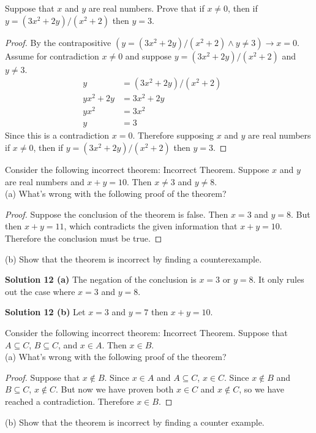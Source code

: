 \begin{tcolorbox}[title=Problem 11, breakable]
    Suppose that $x$ and $y$ are real numbers. Prove that
    if $x \not = 0$, then if $y = (3x^2 + 2y)/(x^2 + 2)$ then $y = 3$.
\end{tcolorbox}

\begin{proof}
    By the contrapositive $(y = (3x^2 + 2y)/(x^2 + 2) \wedge y \not = 3) \rightarrow x = 0$.
    Assume for contradiction $x \not = 0$ and suppose $y = (3x^2 + 2y)/(x^2 + 2)$ and $y \not = 3$.
    \begin{align*}
        y         & = (3x^2 + 2y)/(x^2 + 2) &  & \\
        yx^2 + 2y & = 3x^2 + 2y             &  & \\
        yx^2      & = 3x^2                  &  & \\
        y         & = 3
    \end{align*}
    Since this is a contradiction $x = 0$. Therefore supposing $x$ and $y$ are real numbers 
    if $x \not = 0$, then if $y = (3x^2 + 2y)/(x^2 + 2)$ then $y = 3$.
\end{proof}

\begin{tcolorbox}[title=Problem 12, breakable]
    Consider the following incorrect theorem:
    Incorrect Theorem. Suppose $x$ and $y$ are real
    numbers and $x + y = 10$. Then $x \not = 3$ and $y \not = 8$. \\
    (a) What’s wrong with the following proof of the
    theorem?
    \begin{proof}
        Suppose the conclusion of the theorem is
        false. Then $x = 3$ and $y = 8$. But then $x + y = 11$,
        which contradicts the given information that $x + y
            = 10$. Therefore the conclusion must be true.
    \end{proof}
    (b) Show that the theorem is incorrect by finding a
    counterexample.
\end{tcolorbox}

\textbf{Solution 12 (a)}
The negation of the conclusion is $x = 3$ or $y = 8$. It only rules out
the case where $x = 3$ and $y = 8$. 

\textbf{Solution 12 (b)} Let $x = 3$ and $y = 7$ then $x + y = 10$.

\begin{tcolorbox}[title=Problem 13, breakable]Consider the following incorrect theorem:
    Incorrect Theorem. Suppose that $A \subseteq C$, $B \subseteq C$,
    and $x \in A$. Then $x \in B$. \\
    (a) What’s wrong with the following proof of the
    theorem?
    \begin{proof}
        Suppose that $x \not\in B$. Since $x \in A$ and $A \subseteq C$, $x
            \in C$. Since $x \not\in B$ and $B \subseteq C$, $x \not\in C$. But now we
        have proven both $x \in C$ and $x \not\in C$, so we have
        reached a contradiction. Therefore $x \in B$.
    \end{proof}
    (b) Show that the theorem is incorrect by finding a counter example.
\end{tcolorbox}

